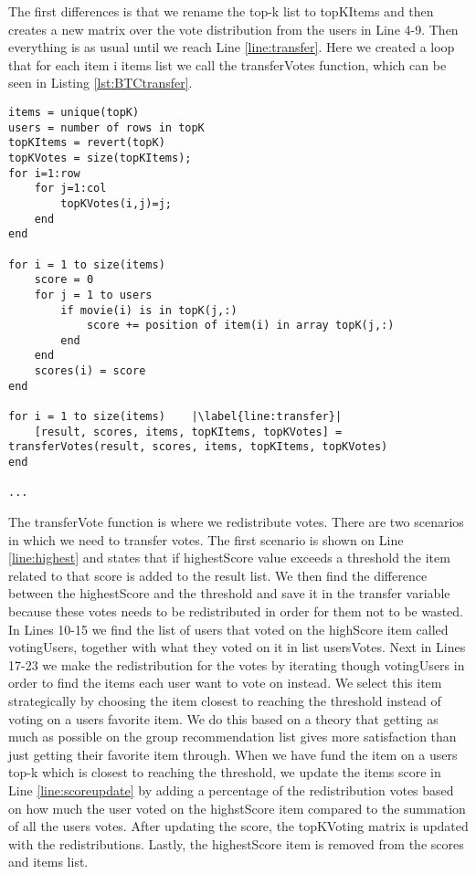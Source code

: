 The first differences is that we rename the top-k list to topKItems and then creates a new matrix over the vote distribution from the users in Line 4-9. Then everything is as usual until we reach Line \ref{line:transfer}. Here we created a loop that for each item i items list we call the transferVotes function, which can be seen in Listing \ref{lst:BTCtransfer}.


\begin{lstlisting}[caption={Borda transferable count implementation},label=lst:BTC,escapechar=|]
items = unique(topK)
users = number of rows in topK
topKItems = revert(topK)
topKVotes = size(topKItems);
for i=1:row
    for j=1:col
        topKVotes(i,j)=j;
    end 
end

for i = 1 to size(items)
	score = 0
	for j = 1 to users
		if movie(i) is in topK(j,:)
			score += position of item(i) in array topK(j,:)
		end
	end
	scores(i) = score
end

for i = 1 to size(items)	|\label{line:transfer}|
	[result, scores, items, topKItems, topKVotes] = transferVotes(result, scores, items, topKItems, topKVotes)
end
	
...
\end{lstlisting}

The transferVote function is where we redistribute votes. There are two scenarios in which we need to transfer votes. The first scenario is shown on Line \ref{line:highest} and states that if highestScore value exceeds a threshold the item related to that score is added to the result list. We then find the difference between the highestScore and the threshold and save it in the transfer variable because these votes needs to be redistributed in order for them not to be wasted. In Lines 10-15 we find the list of users that voted on the highScore item  called votingUsers, together with what they voted on it in list usersVotes. Next in Lines 17-23 we make the redistribution for the votes by iterating though votingUsers in order to find the items each user want to vote on instead. We select this item strategically by choosing the item closest to reaching the threshold instead of voting on a users favorite item. We do this based on a theory that getting as much as possible on the group recommendation list gives more satisfaction than just getting their favorite item through. When we have fund the item on a users top-k which is closest to reaching the threshold, we update the items score in Line \ref{line:scoreupdate} by adding a percentage of the redistribution votes based on how much the user voted on the highstScore item compared to the summation of all the users votes. After updating the score, the topKVoting matrix is updated with the redistributions. Lastly, the highestScore item is removed from the scores and items list. 

